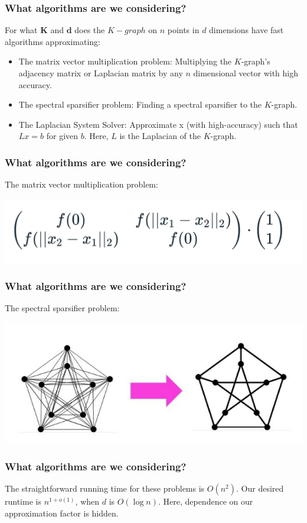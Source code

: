  \begin{frame}
  \frametitle{What algorithms are we considering?}
   For what $\textbf{K}$ and $\textbf{d}$ does the $K-graph$ on $n$
   points in $d$ dimensions have fast algorithms approximating:
  \begin{itemize}
    \item <+-> The {\color{red}matrix vector multiplication problem}:
      Multiplying the $K$-graph's adjacency matrix or Laplacian matrix
      by any $n$ dimensional vector with high accuracy.
    \item <+-> The {\color{darkblue}spectral sparsifier problem}: Finding a
      spectral sparsifier to the $K$-graph.
    \item <+->  The {\color{darkgreen}Laplacian System Solver}:
      Approximate x (with high-accuracy) such that $Lx=b$ for given $b$.
      Here, $L$ is the Laplacian of the $K$-graph.
  \end{itemize}
 \end{frame}

 \begin{frame}
  \frametitle{What algorithms are we considering?}
   The {\color{red}matrix vector multiplication problem}:
   \begin{center}
     \includegraphics[width=1\textwidth]{figs/mv.png}
   \end{center}
 \end{frame}

 \begin{frame}
  \frametitle{What algorithms are we considering?}
    The {\color{darkblue}spectral sparsifier problem}:
    \begin{center}
     \includegraphics[width=1\textwidth]{figs/sparsifier.png}
   \end{center}
 \end{frame}

 \begin{frame}
  \frametitle{What algorithms are we considering?}
    The straightforward running time for these problems is
      $O(n^2)$. Our desired runtime is $n^{1+o(1)}$, when $d$ is $O(\log
      n)$. Here, dependence on our approximation factor is hidden.
  \end{frame}
